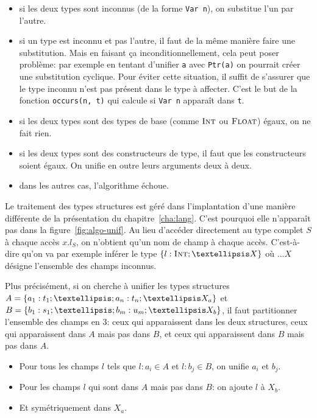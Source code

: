 \begin{itemize}

\item si les deux types sont inconnus (de la forme \texttt{Var n}), on substitue
l'un par l'autre.

\item si un type est inconnu et pas l'autre, il faut de la même manière faire
une substitution.
Mais en faisant ça inconditionnellement, cela peut poser problème:
par exemple en tentant d'unifier \texttt{a} avec \verb!Ptr(a)! on pourrait
créer une substitution cyclique.
Pour éviter cette situation, il suffit de s'assurer que le type inconnu n'est
pas présent dans le type à affecter. C'est le but de la fonction
\texttt{occurs(n, t)} qui calcule si \texttt{Var n} apparaît dans \texttt{t}.

\item si les deux types sont des types de base (comme $\textsc{Int}$ ou $\textsc{Float}$)
égaux, on ne fait rien.

\item si les deux types sont des constructeurs de type, il faut que les
constructeurs soient égaux. On unifie en outre leurs arguments deux à deux.

\item dans les autres cas, l'algorithme échoue.

\end{itemize}

Le traitement des types structures est géré dans l'implantation d'une manière
différente de la présentation du chapitre~\ref{cha:lang}. C'est pourquoi elle
n'apparaît pas dans la figure~\ref{fig:algo-unif}. Au lieu d'accéder directement
au type complet $S$ à chaque accès $x.l_S$, on n'obtient qu'un nom de champ à
chaque accès. C'est-à-dire qu'on va par exemple inférer le type $\tStruct{ l:
\tInt ; …X }$ où $…X$ désigne l'ensemble des champs inconnus.

Plus précisément, si on cherche à unifier les types structures
$A = \tStruct{ a_1: t_1 ; … ; a_n: t_n; …X_a }$
et
$B = \tStruct{ b_1: s_1 ; … ; b_m: u_m; …X_b }$,
il faut partitionner l'ensemble des champs en 3: ceux qui apparaissent dans les
deux structures, ceux qui apparaissent dans $A$ mais pas dans $B$, et ceux qui
apparaissent dans $B$ mais pas dans $A$.

\begin{itemize}
    \item Pour tous les champs $l$ tels que $l: a_i ∈ A$ et $l: b_j ∈ B$,
        on unifie $a_i$ et $b_j$.
    \item Pour les champs $l$ qui sont dans $A$ mais pas dans $B$: on ajoute $l$
        à $X_b$.
    \item Et symétriquement dans $X_a$.
\end{itemize}


